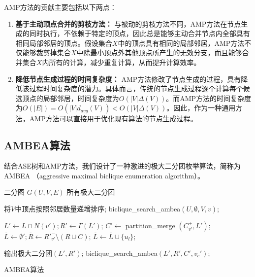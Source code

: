 AMP方法的贡献主要包括以下两点：

\begin{enumerate}
  \item \textbf{基于主动顶点合并的剪枝方法：} 与被动的剪枝方法不同，AMP方法在节点生成的同时执行，不依赖于特定的顶点，因此总是能够主动合并节点内全部具有相同局部邻居的顶点。假设集合$X$中的顶点具有相同的局部邻居，AMP方法不仅能够裁剪掉集合$X$中除最小顶点外其他顶点所产生的无效分支，而且能够合并集合$X$内所有的计算，减少重复计算，从而提升计算效率。
  
  \item \textbf{降低节点生成过程的时间复杂度：} AMP方法修改了节点生成的过程，具有降低该过程时间复杂度的潜力。具体而言，传统的节点生成过程逐个计算每个候选顶点的局部邻居，时间复杂度为$O(|V|\Delta(V))$。而AMP方法的时间复杂度为$O(|E|) =O(|V|d_{avg}(V)) < O(|V|\Delta(V))$。因此，作为一种通用方法，AMP方法可以直接用于优化现有算法的节点生成过程。

\end{enumerate}

\subsection{AMBEA算法}
\label{subsec:ambea}
  结合ASE树和AMP方法，我们设计了一种激进的极大二分团枚举算法，简称为AMBEA （aggressive maximal biclique enumeration algorithm）。

\begin{algorithm}[H]
  \begin{algorithmic}[1]
    \normalsize
    \REQUIRE 二分图 $G(U,V,E)$
    \ENSURE 所有极大二分团
    
    \renewcommand{\algorithmicwhile}{\textbf{procedure}}
    \renewcommand{\algorithmicdo}{\textbf{:}}

    \STATE 将$V$中顶点按照邻居数量递增排序;
      \STATE \textsf{biclique\_search\_ambea}$(U,\emptyset,V,v)$;
    \ENDFOR

    \renewcommand{\algorithmicdo}{\textbf{do}}
      \STATE $L' \leftarrow L \cap N(v'); R' \leftarrow \Gamma(L')$;
      \STATE $C' \leftarrow$ \textsf{partition\_merge}    $(C_{v'}^+, L')$;
      \STATE $\overline{L} \leftarrow \emptyset'; \overline{R}\leftarrow {R'}_{v'}^- \setminus (R \cup C)$;
          \STATE $\overline{L} \leftarrow \overline{L} \cup \{u_l\}$;
        \ENDIF
      \ENDFOR

        \STATE 输出极大二分团$(L', R')$;
            \STATE \textsf{biclique\_search\_ambea}$(L', R', C', v_c')$;
          \ENDIF
        \ENDFOR
      \ENDIF
    \ENDWHILE

  \end{algorithmic}
  \caption{AMBEA算法}
  \label{alg:ambea}
\end{algorithm}

